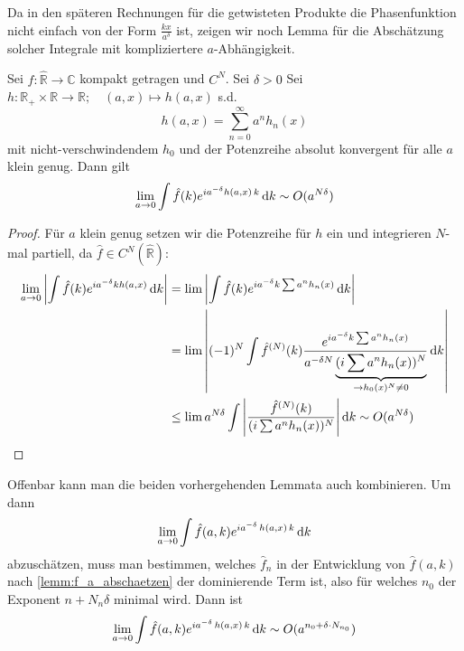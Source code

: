 Da in den späteren Rechnungen für die getwisteten Produkte die Phasenfunktion nicht einfach von der Form \(\frac{k x}{a^{\delta}}\) ist, zeigen wir noch Lemma für die Abschätzung solcher Integrale mit kompliziertere $a$-Abhängigkeit.

\begin{lemma}
\label{lemm:f_a_komplizierte_phase}
Sei \(\hat f:\hat{\mathbb{R}} \to \mathbb{C}\) kompakt getragen und \(C^N\). Sei \(\delta > 0\)
Sei \(h: \mathbb{R}_+ \times \mathbb{R} \to \mathbb{R}; \quad (a,x) \mapsto h(a,x)\) s.d.
\begin{equation*}
    h(a,x) = \sum_{n=0}^\infty a^n h_n(x)
\end{equation*}
mit nicht-verschwindendem \(h_0\) und der Potenzreihe absolut konvergent für alle \(a\) klein genug. Dann gilt
\begin{equation*}
    \lim_{a \to 0} \int \hat f(k) e^{i a^{-\delta} h(a,x)\,k} \mathop{}\!\mathrm{d} k
    \sim O(a^{N \delta})
\end{equation*}
\end{lemma}

\begin{proof}
Für \(a\) klein genug setzen wir die Potenzreihe für \(h\) ein und integrieren \(N\)-mal partiell, da \( \hat f \in C^N(\hat{\mathbb{R}})\):
\begin{align*}
    \lim_{a \to 0}
    \left\lvert \int \hat f(k) e^{ia^{-\delta}kh(a,x)} \mathop{}\!\mathrm{d} k \right\rvert
    &=
    \lim
    \left\lvert
        \int  \hat f(k) e^{ia^{-\delta}k\sum a^n h_n(x)} \mathop{}\!\mathrm{d} k
    \right\rvert
    \\ &=
    \lim
    \left\lvert
        (-1)^N \int \hat f^{(N)}(k) \frac{e^{ia^{-\delta}k\sum a^n h_n(x)}}
        {a^{-\delta N}\underbrace{(i \sum a^n h_n(x))^N}_{\to h_0(x)^N \neq 0}}
        \mathop{}\!\mathrm{d} k
    \right\rvert
    \\ &\leq \lim
    a^{N \delta} \int \left\lvert \frac{\hat f^{(N)}(k)}{(i \sum a^n h_n(x))^N} \right\rvert \mathop{}\!\mathrm{d} k
    \sim O (a^{N \delta})
\end{align*}
\end{proof}

\begin{remark}
    Offenbar kann man die beiden vorhergehenden Lemmata auch kombinieren. Um dann \[\lim_{a \to 0} \int \hat f(a,k) e^{i a^{-\delta}\, h (a,x) \,k} \mathop{}\!\mathrm{d} k\]
    abzuschätzen, muss man bestimmen, welches \(\hat f_n\) in der Entwicklung von \(\hat f(a,k)\) nach \cref{lemm:f_a_abschaetzen} der dominierende Term ist, also für welches \(n_0\) der Exponent \(n+N_n \delta\) minimal wird. Dann ist
    \[
    \lim_{a \to 0} \int \hat f(a,k) e^{i a^{-\delta}\, h (a,x) \,k} \mathop{}\!\mathrm{d} k
    \sim
    O(a^{n_0+\delta \cdot N_{n_0}})
    \]
\end{remark}

